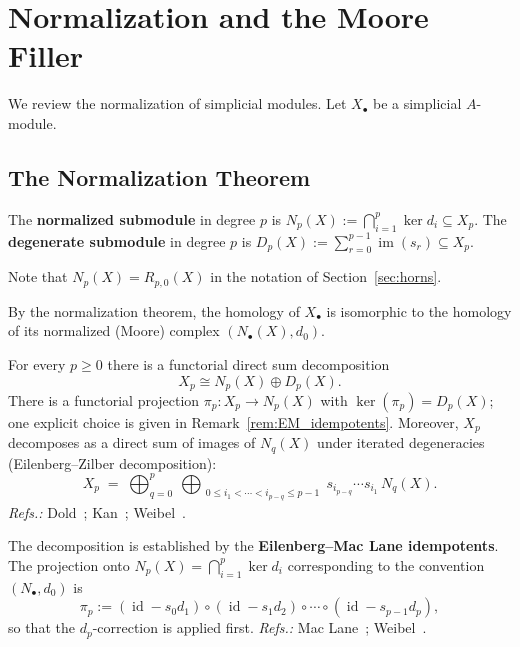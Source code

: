
\section{Normalization and the Moore Filler}
\label{sec:normalization}

We review the normalization of simplicial modules. Let $X_\bullet$ be a simplicial $A$-module.

\subsection{The Normalization Theorem}


\begin{definition}\label{def:normalized_degenerate}
The \textbf{normalized submodule} in degree $p$ is $N_p(X):=\bigcap_{i=1}^{p}\ker d_i\subseteq X_p$.
The \textbf{degenerate submodule} in degree $p$ is $D_p(X):=\sum_{r=0}^{p-1}\operatorname{im}(s_r)\subseteq X_p$.
\end{definition}

Note that $N_p(X)=R_{p,0}(X)$ in the notation of Section~\ref{sec:horns}.

By the normalization theorem, the homology of $X_\bullet$ is isomorphic to the homology of its normalized (Moore) complex $(N_\bullet(X), d_0)$.



\begin{theorem}\label{thm:EZ}
For every $p\ge0$ there is a functorial direct sum decomposition
\[
X_p\cong N_p(X)\oplus D_p(X).
\]
There is a functorial projection $\pi_p:X_p\to N_p(X)$ with $\ker(\pi_p)=D_p(X)$; one explicit choice is given in Remark~\ref{rem:EM_idempotents}. 
Moreover, $X_p$ decomposes as a direct sum of images of $N_q(X)$ under iterated degeneracies (Eilenberg--Zilber decomposition):
\[
X_p \;=\; \bigoplus_{q=0}^{p}\ \bigoplus_{\substack{0\le i_1<\cdots<i_{p-q}\le p-1}} s_{i_{p-q}}\cdots s_{i_1}\,N_{q}(X).
\]
\emph{Refs.:} Dold~\cite{Dold1958}; Kan~\cite{Kan1958}; Weibel~\cite[Thm 8.3.8, Cor 8.4.2]{Weibel}.
\end{theorem}


\begin{remark}\label{rem:EM_idempotents}
The decomposition is established by the \textbf{Eilenberg--Mac Lane idempotents}. The projection onto
$N_p(X)=\bigcap_{i=1}^{p}\ker d_i$ corresponding to the convention $(N_\bullet,d_0)$ is
\[
\pi_p
:= (\operatorname{id} - s_0d_1)\circ(\operatorname{id} - s_1d_2)\circ\cdots\circ(\operatorname{id} - s_{p-1}d_p),
\]
so that the $d_p$-correction is applied first.
\emph{Refs.:} Mac Lane~\cite[Ch.~VIII, §6]{MacLaneHomology}; Weibel~\cite[Thm 8.3.8]{Weibel}.
\end{remark}

